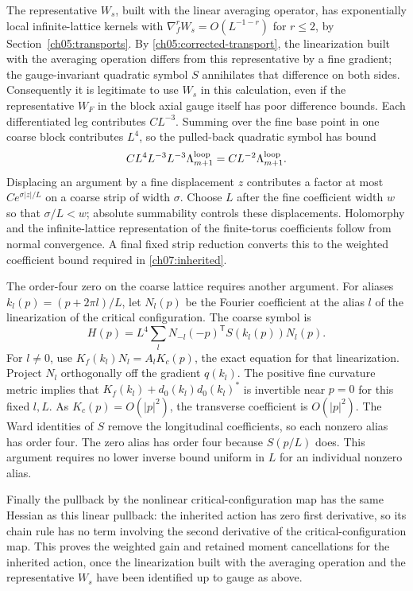 The representative $W_s$, built with the linear averaging operator, has exponentially local infinite-lattice
kernels with $\nabla_f^rW_s=O(L^{-1-r})$ for $r\le2$, by
Section~\ref{ch05:transports}. By \eqref{ch05:corrected-transport}, the linearization built with the averaging operation differs
from this representative by a fine gradient; the gauge-invariant
quadratic symbol $S$ annihilates that difference on both sides.
Consequently it is legitimate to use $W_s$ in this calculation, even
if the representative $W_F$ in the block axial gauge itself has poor difference bounds.
Each differentiated leg contributes $CL^{-3}$. Summing over the fine base point in
one coarse block contributes $L^4$, so the pulled-back quadratic symbol has
bound
\[
 C L^4 L^{-3}L^{-3}\Lambda_{m+1}^{\rm loop}
       =CL^{-2}\Lambda_{m+1}^{\rm loop}.
\]
Displacing an argument by a fine displacement $z$ contributes a factor at most
$Ce^{\sigma|z|/L}$ on a coarse strip of width $\sigma$.
Choose $L$ after the fine coefficient width $w$ so that $\sigma/L<w$;
absolute summability controls these displacements. Holomorphy and the
infinite-lattice representation of the finite-torus coefficients follow from normal convergence.
A final fixed strip reduction converts this to the weighted coefficient
bound required in \eqref{ch07:inherited}.

The order-four zero on the coarse lattice requires another argument.
For aliases $k_l(p)=(p+2\pi l)/L$, let $N_l(p)$ be the Fourier
coefficient at the alias $l$ of the linearization of the critical configuration. The coarse symbol is
\[
 H(p)=L^4\sum_l N_{-l}(-p)^{\mathsf T}S(k_l(p))N_l(p).
\]
For $l\ne0$, use $K_f(k_l)N_l=A_lK_c(p)$, the exact equation for
that linearization. Project $N_l$ orthogonally off the gradient
$q(k_l)$. The positive fine curvature metric implies that
$K_f(k_l)+d_0(k_l)d_0(k_l)^*$ is invertible near $p=0$ for this fixed
$l,L$. As $K_c(p)=O(|p|^2)$, the transverse coefficient is $O(|p|^2)$.
The Ward identities of $S$ remove the longitudinal coefficients, so each
nonzero alias has order four. The zero alias has order four
because $S(p/L)$ does. This argument requires no lower inverse bound
uniform in $L$ for an individual nonzero alias.

Finally the pullback by the nonlinear critical-configuration map has the same Hessian as this
linear pullback: the inherited action has zero first derivative, so its
chain rule has no term involving the second derivative of the critical-configuration map.
This proves the weighted gain and retained moment cancellations for the
inherited action, once the linearization built with the averaging operation and the representative $W_s$
have been identified up to gauge as above.

